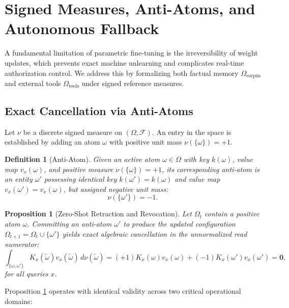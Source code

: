 \documentclass[preprint,12pt]{elsarticle}
\newtheorem{definition}{Definition}
\newtheorem{proposition}{Proposition}
\begin{document}
\section{Signed Measures, Anti-Atoms, and Autonomous Fallback}

A fundamental limitation of parametric fine-tuning is the irreversibility of weight updates, which prevents exact machine unlearning and complicates real-time authorization control. We address this by formalizing both factual memory $\Omega_{\mathrm{corpus}}$ and external tools $\Omega_{\mathrm{tools}}$ under signed reference measures.

\subsection{Exact Cancellation via Anti-Atoms}

Let $\nu$ be a discrete signed measure on $(\Omega, \mathcal{F})$. An entry in the space is established by adding an atom $\omega$ with positive unit mass $\nu(\{\omega\}) = +1$.

\begin{definition}[Anti-Atom]
Given an active atom $\omega \in \Omega$ with key $k(\omega)$, value map $v_x(\omega)$, and positive measure $\nu(\{\omega\}) = +1$, its corresponding anti-atom is an entity $\omega'$ possessing identical key $k(\omega') = k(\omega)$ and value map $v_x(\omega') = v_x(\omega)$, but assigned negative unit mass:
\begin{equation}
\nu(\{\omega'\}) = -1.
\end{equation}
\end{definition}

\begin{proposition}[Zero-Shot Retraction and Revocation]
Let $\Omega_t$ contain a positive atom $\omega$. Committing an anti-atom $\omega'$ to produce the updated configuration $\Omega_{t+1} = \Omega_t \cup \{\omega'\}$ yields exact algebraic cancellation in the unnormalized read numerator:
\begin{equation}
\int_{\{\omega, \omega'\}} K_x(\tilde{\omega}) v_x(\tilde{\omega}) \, d\nu(\tilde{\omega}) = (+1) K_x(\omega) v_x(\omega) + (-1) K_x(\omega') v_x(\omega') = \mathbf{0},
\end{equation}
for all queries $x$.
\label{prop:anti_atom}
\end{proposition}

Proposition \ref{prop:anti_atom} operates with identical validity across two critical operational domains:
\end{document}
